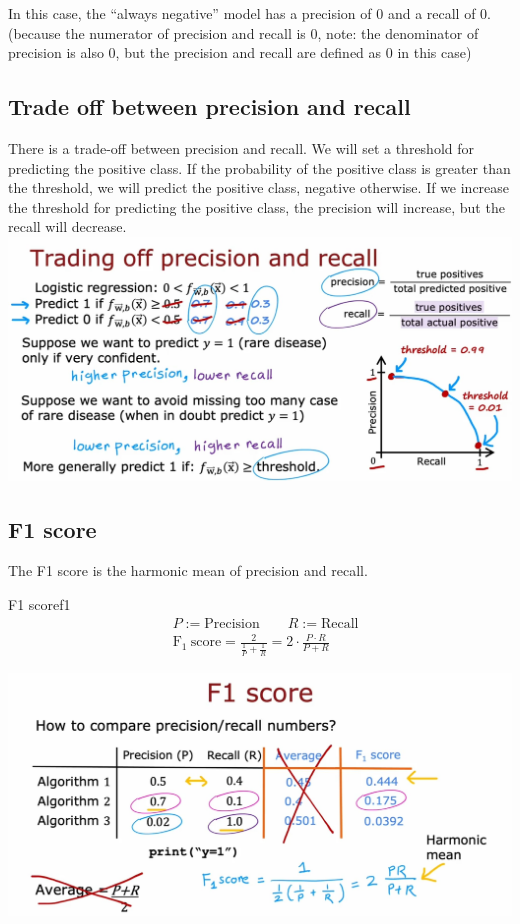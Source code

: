 \par
In this case, the ``always negative'' model has a precision of 0 and a recall of 0.(because the numerator of
precision and recall is 0, note: the denominator of precision is also 0, but the precision and recall are defined as 0 in this case)
\par
\subsection*{Trade off between precision and recall}
There is a trade-off between precision and recall. 
We will set a threshold for predicting the positive class. If the probability of the positive class is greater than the threshold,
we will predict the positive class, negative otherwise. 
If we increase the threshold for predicting the positive class,
the precision will increase, but the recall will decrease.\\
\includegraphics*[width=\textwidth]{images/10.29}
\par
\subsection*{F1 score}
The F1 score is the harmonic mean of precision and recall.
\begin{thmbox}{F1 score}{f1}
\begin{align}
    & P := \text{Precision} \qquad R := \text{Recall} \nonumber \\ 
    &\mathrm{F_1\ score} = \frac{2}{\frac{1}{P} + \frac{1}{R}}= 2 \cdot \frac{P \cdot R}{P + R}
\end{align}
\end{thmbox}
\par
\includegraphics*[width=\textwidth]{images/10.30}